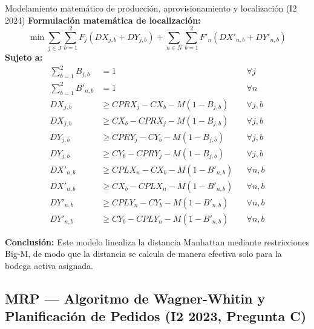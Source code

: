 \begin{ejercicio}{Modelamiento matemático de producción, aprovisionamiento y localización (I2 2024)}
\textbf{Formulación matemática de localización:}
\[
  \min \sum_{j\in J} \sum_{b=1}^{2} F_{j} (DX_{j,b} + DY_{j,b}) + \sum_{n\in N} \sum_{b=1}^{2} F'_{n} (DX'_{n,b} + DY'_{n,b})
\]
\textbf{Sujeto a:}
\begin{align*}
  \sum_{b=1}^{2} B_{j,b} &= 1 && \forall j \\
  \sum_{b=1}^{2} B'_{n,b} &= 1 && \forall n \\
  DX_{j,b} &\ge CPRX_j - CX_b - M(1 - B_{j,b}) && \forall j, b \\
  DX_{j,b} &\ge CX_b - CPRX_j - M(1 - B_{j,b}) && \forall j, b \\
  DY_{j,b} &\ge CPRY_j - CY_b - M(1 - B_{j,b}) && \forall j, b \\
  DY_{j,b} &\ge CY_b - CPRY_j - M(1 - B_{j,b}) && \forall j, b \\
  DX'_{n,b} &\ge CPLX_n - CX_b - M(1 - B'_{n,b}) && \forall n, b \\
  DX'_{n,b} &\ge CX_b - CPLX_n - M(1 - B'_{n,b}) && \forall n, b \\
  DY'_{n,b} &\ge CPLY_n - CY_b - M(1 - B'_{n,b}) && \forall n, b \\
  DY'_{n,b} &\ge CY_b - CPLY_n - M(1 - B'_{n,b}) && \forall n, b
\end{align*}

\textbf{Conclusión:} Este modelo linealiza la distancia Manhattan mediante restricciones Big-M, de modo que la distancia se calcula de manera efectiva solo para la bodega activa asignada.
\end{ejercicio}


\subsection[MRP: Wagner-Whitin (I2 2023)]{MRP --- Algoritmo de Wagner-Whitin y Planificación de Pedidos (I2 2023, Pregunta C)}

